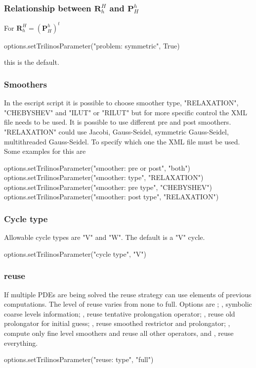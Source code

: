 \subsubsection{Relationship between $\mathbf{R}_h^H$  and $\mathbf{P}^h_H$}
For $\mathbf{R}_h^H=(\mathbf{P}^h_H)^t$
\begin{python}
options.setTrilinosParameter("problem: symmetric", True)
\end{python}
this is the default.

\subsubsection{Smoothers}
In the escript script it is possible to choose smoother type, "RELAXATION", "CHEBYSHEV" and "ILUT" or "RILUT" but for more specific control the XML file needs to be used.  It is possible to use different pre and post smoothers.  "RELAXATION" could use Jacobi, Gauss-Seidel, symmetric Gauss-Seidel, multithreaded Gauss-Seidel.  To specify which one the XML file must be used.  Some examples for this are 
\begin{python}
options.setTrilinosParameter("smoother: pre or post", "both")
options.setTrilinosParameter("smoother: type", "RELAXATION")
options.setTrilinosParameter("smoother: pre type", "CHEBYSHEV")
options.setTrilinosParameter("smoother: post type", "RELAXATION")
\end{python}

\subsubsection{Cycle type}
Allowable cycle types are "V" and "W".  The default is a "V" cycle.
\begin{python}
options.setTrilinosParameter("cycle type", "V")
\end{python}

\subsubsection{reuse}
If multiple PDEs are being solved the reuse strategy can use elements of previous computations.  The level of reuse varies from none to full.  Options are ; , symbolic coarse levels information; , reuse tentative prolongation operator; , reuse old prolongator for initial guess; , reuse smoothed restrictor and prolongator; , compute only fine level smoothers and reuse all other operators, and , reuse everything.
\begin{python}
options.setTrilinosParameter("reuse: type", "full")
\end{python}

